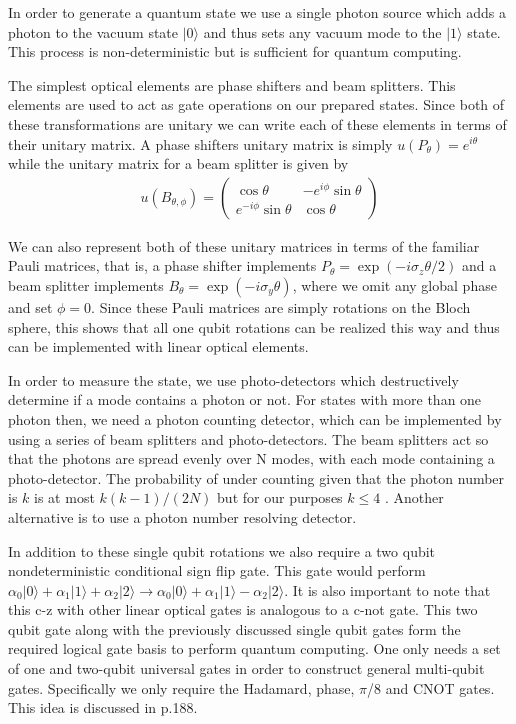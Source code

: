 \documentclass[aps,pra,twocolumn,amsmath,amssymb,nofootinbib,superscriptaddress]{revtex4}
\newcommand{\ket}[1]{|#1\rangle}
\begin{document}
In order to generate a quantum state we use a single photon source which adds a photon to the vacuum state $\ket{0}$ and thus sets any vacuum mode to the $\ket{1}$ state. This process is non-deterministic but is sufficient for quantum computing.

The simplest optical elements are phase shifters and beam splitters. This elements are used to act as gate operations on our prepared states. Since both of these transformations are unitary we can write each of these elements in terms of their unitary matrix. A phase shifters unitary matrix is simply $u(P_\theta)= e^{i \theta}$ while the unitary matrix for a beam splitter is given by
\begin{eqnarray}
u(B_{\theta,\phi})=
\left(
\begin{array}{cc}
\cos{\theta}& -e^{i \phi} \sin{\theta} \\
e^{-i \phi} \sin{\theta}& \cos{\theta} 
\end{array}
\right)
\end{eqnarray}

We can also represent both of these unitary matrices in terms of the familiar Pauli matrices, that is, a phase shifter implements $P_\theta = \exp{(-i \sigma_z \theta/2)}$ and a beam splitter implements $B_\theta = \exp{(-i \sigma_y \theta)}$, where we omit any global phase and set $\phi=0$. Since these Pauli matrices are simply rotations on the Bloch sphere, this shows that all one qubit rotations can be realized this way and thus can be implemented with linear optical elements.

In order to measure the state, we use photo-detectors which destructively determine if a mode contains a photon or not. For states with more than one photon then, we need a photon counting detector, which can be implemented by using a series of beam splitters and photo-detectors. The beam splitters act so that the photons are spread evenly over N modes, with each mode containing a photo-detector. The probability of under counting given that the photon number is $k$ is at most $k(k-1)/(2N)$ but for our purposes $k \le 4 $ \cite{knill}. Another alternative is to use a photon number resolving detector.

In addition to these single qubit rotations we also require a two qubit nondeterministic conditional sign flip gate. \cite{knill} This gate would perform $\alpha_0 \ket{0} + \alpha_1 \ket{1} +\alpha_2 \ket{2} \rightarrow \alpha_0 \ket{0} + \alpha_1 \ket{1} - \alpha_2 \ket{2}$. It is also important to note that this c-z with other linear optical gates is analogous to a c-not gate. This two qubit gate along with the previously discussed single qubit gates form the required logical gate basis to perform quantum computing. One only needs a set of one and two-qubit universal gates in order to construct general multi-qubit gates. Specifically we only require the Hadamard, phase, $\pi$/8 and CNOT gates. This idea is discussed in \cite{nielsen} p.188.
\end{document}
